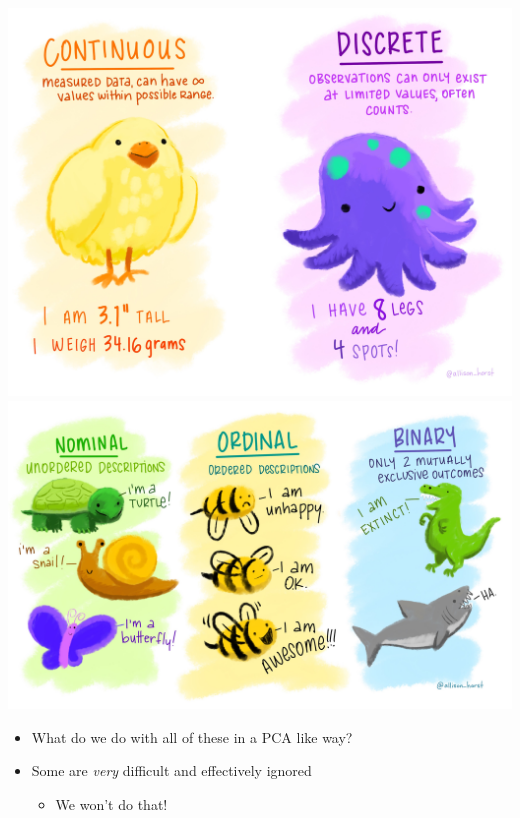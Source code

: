 \documentclass[
  ignorenonframetext,
]{beamer}
\providecommand{\tightlist}{%
  \setlength{\itemsep}{0pt}\setlength{\parskip}{0pt}}
\begin{document}
\begin{frame}

\includegraphics[width=\textwidth,height=0.4\textheight]{../images/cont_disc.jpg}\includegraphics[width=\textwidth,height=0.4\textheight]{../images/nom_ord_bin.jpg}

\begin{itemize}[<+->]
\tightlist
\item
  What do we do with all of these in a PCA like way?
\item
  Some are \emph{very} difficult and effectively ignored

  \begin{itemize}[<+->]
  \tightlist
  \item
    We won't do that!
  \end{itemize}
\end{itemize}

\end{frame}
\end{document}
